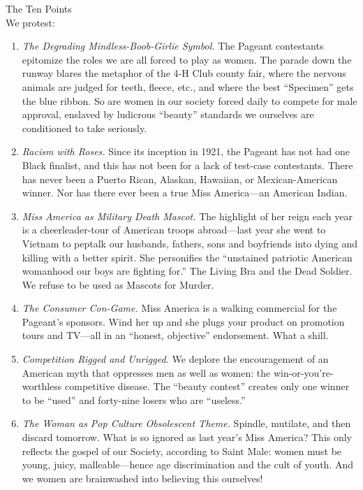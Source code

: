 \documentclass{article}
\begin{document}
The Ten Points\\
We protest:

\begin{enumerate}
	\item \emph{The Degrading Mindless-Boob-Girlie Symbol.} The Pageant
		contestants epitomize the roles we are all forced to play as women. The
		parade down the runway blares the metaphor of the 4-H Club county fair,
		where the nervous animals are judged for teeth, fleece, etc., and where
		the best ``Specimen'' gets the blue ribbon. So are women in our society
		forced daily to compete for male approval, enslaved by ludicrous
		``beauty'' standards we ourselves are conditioned to take seriously.

	\item \emph{Racism with Roses.} Since its inception in 1921, the Pageant
		has not had one Black finalist, and this has not been for a lack of
		test-case contestants. There has never been a Puerto Rican, Alaskan,
		Hawaiian, or Mexican-American winner. Nor has there ever been a true
		Miss America---an American Indian.

	\item \emph{Miss America as Military Death Mascot.} The highlight of her
		reign each year is a cheerleader-tour of American troops abroad---last
		year she went to Vietnam to peptalk our husbands, fathers, sons and
		boyfriends into dying and killing with a better spirit. She personifies
		the ``unstained patriotic American womanhood our boys are fighting
		for.'' The Living Bra and the Dead Soldier. We refuse to be used as
		Mascots for Murder.

	\item \emph{The Consumer Con-Game.} Miss America is a walking commercial
		for the Pageant's sponsors. Wind her up and she plugs your product on
		promotion tours and TV---all in an ``honest, objective'' endorsement.
		What a shill.

	\item \emph{Competition Rigged and Unrigged.} We deplore the encouragement
		of an American myth that oppresses men as well as women: the
		win-or-you’re-worthless competitive disease. The ``beauty contest''
		creates only one winner to be ``used'' and forty-nine losers who are
		``useless.''

	\item \emph{The Woman as Pop Culture Obsolescent Theme.} Spindle, mutilate,
		and then discard tomorrow. What is so ignored as last year's Miss
		America? This only reflects the gospel of our Society, according to
		Saint Male: women must be young, juicy, malleable---hence age
		discrimination and the cult of youth. And we women are brainwashed into
		believing this ourselves!


\end{enumerate}
\end{document}
